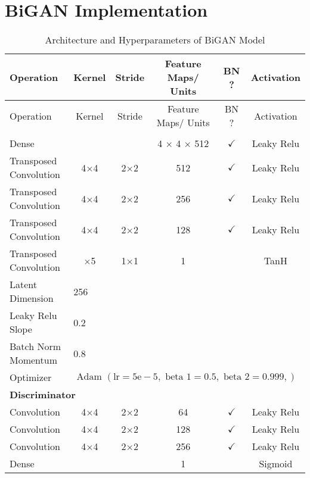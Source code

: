 \section{BiGAN Implementation}
\label{app:bigan}

\footnotesize
\begin{longtable}[c]{@{}lccccc@{}}
	\caption{Architecture and Hyperparameters of BiGAN Model}
	\label{tab:bigan_imp}\\
	\toprule
	Operation & Kernel & Stride & Feature Maps/ Units & BN ? & Activation \\* \midrule
	\endfirsthead
	\toprule
	Operation & Kernel & Stride & Feature Maps/ Units & BN ? & Activation \\* \midrule
	\endhead
	\bottomrule
	\endfoot
	\endlastfoot
	\multicolumn{6}{l}{\textbf{Generator}} \\
	Dense & \multicolumn{1}{c}{} &  & 4 $\times$ 4 $\times$ 512 & $\checkmark$ & Leaky Relu \\
	Transposed Convolution & \multicolumn{1}{c}{4$\times$4} & 2$\times$2 & 512 & $\checkmark$ & Leaky Relu \\
	Transposed Convolution & \multicolumn{1}{c}{4$\times$4} & 2$\times$2 & 256 & $\checkmark$ & Leaky Relu \\
	Transposed Convolution & \multicolumn{1}{c}{4$\times$4} & 2$\times$2 & 128 & $\checkmark$ & Leaky Relu \\
	Transposed Convolution & \multicolumn{1}{c}{$\times$5} & 1$\times$1 & 1 &  & TanH \\ \hline
	Latent Dimension & \multicolumn{5}{l}{256} \\
	Leaky Relu Slope & \multicolumn{5}{l}{0.2} \\
	Batch Norm Momentum & \multicolumn{5}{l}{0.8} \\
	Optimizer & \multicolumn{5}{l}{$\text { Adam }(\mathrm{lr}=5 \mathrm{e}-5, \text { beta } 1=0.5, \text { beta } 2=0.999,)$} \\ \hline
	\multicolumn{6}{l}{\textbf{Discriminator}} \\
	Convolution & \multicolumn{1}{c}{4$\times$4} & 2$\times$2 & 64 & $\checkmark$ & Leaky Relu \\
	Convolution & \multicolumn{1}{c}{4$\times$4} & 2$\times$2 & 128 & $\checkmark$ & Leaky Relu \\
	Convolution & \multicolumn{1}{c}{4$\times$4} & 2$\times$2 & 256 & $\checkmark$ & Leaky Relu \\
	Dense & \multicolumn{1}{c}{} &  & 1 &  & Sigmoid \\ \hline

\end{longtable}
